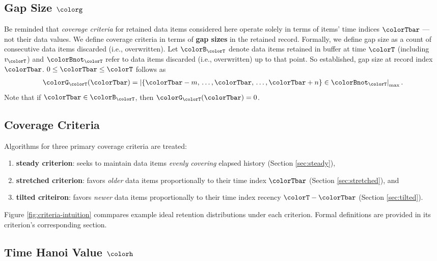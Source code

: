 \subsection{Gap Size $\colorg$}
\label{sec:notation-gapsize}

Be reminded that \textit{coverage criteria} for retained data items considered here operate solely in terms of items' time indices $\colorTbar$ --- not their data values.
We define coverage criteria in terms of \textbf{gap sizes} in the retained record.
Formally, we define gap size as a count of consecutive data items discarded (i.e., overwritten).
Let $\colorB_{\colorT}$ denote data items retained in buffer at time $\colorT$ (including $v_{\colorT}$) and $\colorBnot_{\colorT}$ refer to data items discarded (i.e., overwritten) up to that point.
So established, gap size at record index $\colorTbar$. $0 \leq \colorTbar \leq \colorT$ follows as
\begin{align*}
\colorG_{\colorT}(\colorTbar) = \left| \{\colorTbar - m, \,\ldots, \colorTbar, \,\ldots, \colorTbar+n\} \in \colorBnot_{\colorT} \right|_\mathrm{max}.
\end{align*}
Note that if $\colorTbar \in \colorB_{\colorT}$, then $\colorG_{\colorT}(\colorTbar) = 0$.

\subsection{Coverage Criteria}
\label{sec:notation-coverage}

Algorithms for three primary coverage criteria are treated:
\begin{enumerate}
\item \textbf{steady criterion}: seeks to maintain data items \textit{evenly covering} elapsed history (Section \ref{sec:steady}),
\item \textbf{stretched criterion}: favors \textit{older} data items proportionally to their time index $\colorTbar$ (Section \ref{sec:stretched}), and
\item \textbf{tilted criteiron}: favors \textit{newer} data items proportionally to their time index recency $\colorT - \colorTbar$ (Section \ref{sec:tilted}).
\end{enumerate}
Figure \ref{fig:criteria-intuition} commpares example ideal retention distributions under each criterion.
Formal definitions are provided in its criterion's corresponding section.

\subsection{Time Hanoi Value $\colorh$}
\label{sec:notation-hanoi}

